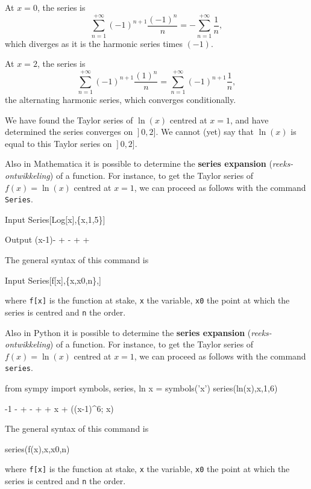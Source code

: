 \begin{example}
At $x=0$, the series is 
$$\sum_{n=1}^{+\infty} (-1)^{n+1}\frac{(-1)^n}{n} = -\sum_{n=1}^{+\infty} \frac1n,$$
which diverges as it is the harmonic series times $(-1)$.

At $x=2$, the series is
$$\sum_{n=1}^{+\infty} (-1)^{n+1}\frac{(1)^n}{n} = \sum_{n=1}^{+\infty} (-1)^{n+1}\frac{1}{n},$$
the alternating harmonic series, which converges conditionally.


We have found the Taylor series of $\ln (x)$ centred at $x=1$, and have determined the series converges on $\left.\right]0,2]$. We cannot (yet) say that $\ln (x)$ is equal to this Taylor series on $\left.\right]0,2]$.
\end{example}

\ifmathematica
Also in Mathematica it is possible to determine the \textbf{series expansion} (\textit{reeks-ontwikkeling}) of a function. For instance, to get the Taylor series of $f(x) = \ln(x)$ centred at $x=1$, we can proceed as follows with the command \lstinline{Series}. 
	\begin{mdframed}[default,backgroundcolor=gray!40,roundcorner=8pt]
\begin{mmaCell}[morefunctionlocal={x}]{Input}
  Series[Log[x],\{x,1,5\}]
\end{mmaCell}

\begin{mmaCell}{Output}
  (x-1)- + - + +
\end{mmaCell}
\end{mdframed}
The general syntax of this command is 
\begin{mmaCell}[morefunctionlocal={x}]{Input}
  Series[f[x],\{x,x0,n\},]
\end{mmaCell}
where \lstinline{f[x]} is the function at stake, \lstinline{x} the variable, \lstinline{x0} the point at which the series is centred and \lstinline{n} the order. 
\fi

\ifpython
Also in Python it is possible to determine the \textbf{series expansion} (\textit{reeks-ontwikkeling}) of a function. For instance, to get the Taylor series of $f(x) = \ln(x)$ centred at $x=1$, we can proceed as follows with the command \lstinline{series}. 
\begin{pyin}
from sympy import symbols, series, ln
x = symbols('x')
series(ln(x),x,1,6)
\end{pyin}
\begin{pyout}
-1 -  +  -  +  + x + ((x-1)^6; x)
\end{pyout}
The general syntax of this command is 
\begin{pyin}
series(f(x),x,x0,n)
\end{pyin}
where \lstinline{f[x]} is the function at stake, \lstinline{x} the variable, \lstinline{x0} the point at which the series is centred and \lstinline{n} the order.
\fi

